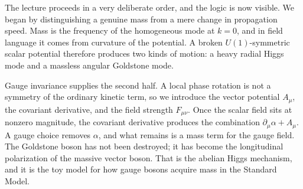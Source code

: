 The lecture proceeds in a very deliberate order, and the logic is now visible. We began by distinguishing a genuine mass from a mere change in propagation speed. Mass is the frequency of the homogeneous mode at \(k=0\), and in field language it comes from curvature of the potential. A broken \(U(1)\)-symmetric scalar potential therefore produces two kinds of motion: a heavy radial Higgs mode and a massless angular Goldstone mode.

Gauge invariance supplies the second half. A local phase rotation is not a symmetry of the ordinary kinetic term, so we introduce the vector potential \(A_\mu\), the covariant derivative, and the field strength \(F_{\mu\nu}\). Once the scalar field sits at nonzero magnitude, the covariant derivative produces the combination \(\partial_\mu\alpha + A_\mu\). A gauge choice removes \(\alpha\), and what remains is a mass term for the gauge field. The Goldstone boson has not been destroyed; it has become the longitudinal polarization of the massive vector boson. That is the abelian Higgs mechanism, and it is the toy model for how gauge bosons acquire mass in the Standard Model.
